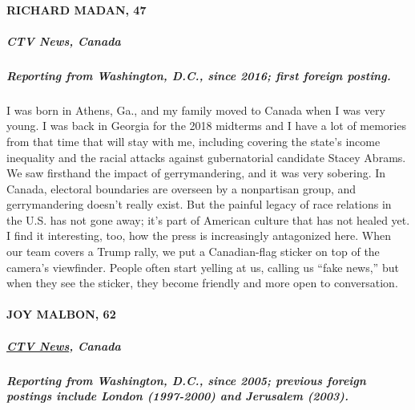 \hypertarget{richard-madan-47}{%
\paragraph{RICHARD MADAN, 47}\label{richard-madan-47}}

\hypertarget{ctv-news-canada}{%
\subparagraph{\texorpdfstring{\textbf{CTV News,
Canada}}{CTV News, Canada}}\label{ctv-news-canada}}

\hypertarget{reporting-from-washington-dc-since-2016-first-foreign-posting}{%
\subparagraph{\texorpdfstring{\textbf{Reporting from ​Washington, D.C.,
since 2016; first foreign
posting.}}{Reporting from ​Washington, D.C., since 2016; first foreign posting.}}\label{reporting-from-washington-dc-since-2016-first-foreign-posting}}

I was born in Athens, Ga., and my family moved to Canada when I was very
young. I was back in Georgia for the 2018 midterms and I have a lot of
memories from that time that will stay with me, including covering the
state's income inequality and the racial attacks against gubernatorial
candidate Stacey Abrams. We saw firsthand the impact of gerrymandering,
and it was very sobering. In Canada, electoral boundaries are overseen
by a nonpartisan group, and gerrymandering doesn't really exist. But the
painful legacy of race relations in the U.S. has not gone away; it's
part of American culture that has not healed yet. I find it interesting,
too, how the press is increasingly antagonized here. When our team
covers a Trump rally, we put a Canadian-flag sticker on top of the
camera's viewfinder. People often start yelling at us, calling us ``fake
news,'' but when they see the sticker, they become friendly and more
open to conversation.

\hypertarget{joy-malbon-62}{%
\paragraph{JOY MALBON, 62}\label{joy-malbon-62}}

\hypertarget{ctv-news-canada-1}{%
\subparagraph{\texorpdfstring{\textbf{\href{https://www.ctvnews.ca/}{CTV
News}, Canada}}{CTV News, Canada}}\label{ctv-news-canada-1}}

\hypertarget{reporting-from-washington-dc-since-2005-previous-foreign-postings-include-london-1997-2000-and-jerusalem-2003}{%
\subparagraph{\texorpdfstring{\textbf{Reporting from Washington, D.C.,
since 2005; previous foreign postings include London (1997-2000) and
Jerusalem
(2003).}}{Reporting from Washington, D.C., since 2005; previous foreign postings include London (1997-2000) and Jerusalem (2003).}}\label{reporting-from-washington-dc-since-2005-previous-foreign-postings-include-london-1997-2000-and-jerusalem-2003}}

